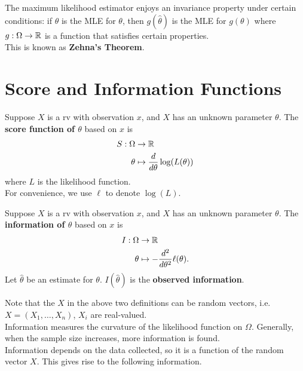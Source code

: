 \documentclass[11pt,fleqn]{book} %
\begin{document}
\begin{remark} \label{rmk:523}
The maximum likelihood estimator enjoys an invariance property under certain conditions: if \(\hat{\theta}\) is the MLE for \(\theta\), then \(g(\hat{\theta})\) is the MLE for \(g(\theta)\) where \(g:\Omega \rightarrow\mathbb{R}\) is a function that satisfies certain properties. \\
\indent This is known as \textbf{Zehna's Theorem}.
\end{remark}


\section{Score and Information Functions}

\begin{definition} \label{def:531}
Suppose \(X\) is a rv with observation \(x\), and \(X\) has an unknown parameter \(\theta\). The \textbf{score function of \(\theta\)} based on \(x\) is
\[
\begin{aligned}
S: \Omega &\rightarrow \mathbb{R} \\
\theta&\mapsto \frac{d}{d\theta}\log(L(\theta))
\end{aligned}
\]
where \(L\) is the likelihood function. \\
\indent For convenience, we use \(\ell\) to denote \(\log(L)\).
\end{definition}

\begin{definition} \label{def:532}
Suppose \(X\) is a rv with observation \(x\), and \(X\) has an unknown parameter \(\theta\). The \textbf{information of \(\theta\)} based on \(x\) is
\[
\begin{aligned}
I: \Omega &\rightarrow \mathbb{R} \\
\theta&\mapsto -\frac{d^2}{d\theta^2}\ell(\theta).
\end{aligned}
\]
\indent Let \(\hat{\theta}\) be an estimate for \(\theta\). \(I(\hat{\theta})\) is the \textbf{observed information}.
\end{definition}

\begin{remark} \label{rmk:533}
Note that the \(X\) in the above two definitions can be random vectors, i.e. \(X = (X_1, \ldots, X_n)\), \(X_i\) are real-valued.\\
\indent Information measures the curvature of the likelihood function on \(\Omega\). Generally, when the sample size increases, more information is found.\\
\indent Information depends on the data collected, so it is a function of the random vector \(X\). This gives rise to the following information.
\end{remark}
\end{document}
